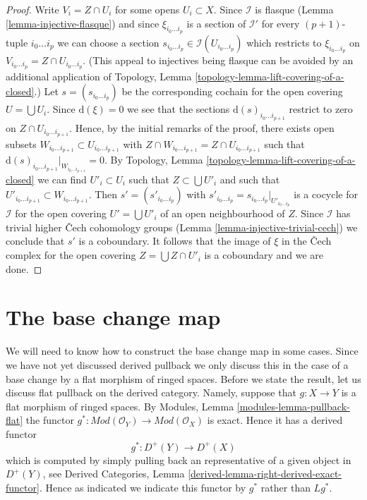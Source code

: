 \begin{proof}
\medskip\noindent
Write $V_i = Z \cap U_i$ for some opens $U_i \subset X$.
Since $\mathcal{I}$ is flasque (Lemma \ref{lemma-injective-flasque})
and since $\xi_{i_0 \ldots i_p}$ is a section of $\mathcal{I}'$
for every $(p + 1)$-tuple $i_0 \ldots i_p$ we can choose
a section $s_{i_0 \ldots i_p} \in \mathcal{I}(U_{i_0 \ldots i_p})$
which restricts to $\xi_{i_0 \ldots i_p}$ on
$V_{i_0 \ldots i_p} = Z \cap U_{i_0 \ldots i_p}$.
(This appeal to injectives being flasque can be avoided by an
additional application of
Topology, Lemma \ref{topology-lemma-lift-covering-of-a-closed}.)
Let $s = (s_{i_0 \ldots i_p})$ be the corresponding cochain
for the open covering $U = \bigcup U_i$.
Since $\text{d}(\xi) = 0$ we see that the sections
$\text{d}(s)_{i_0 \ldots i_{p + 1}}$ restrict to zero
on $Z \cap U_{i_0 \ldots i_{p + 1}}$. Hence, by the initial
remarks of the proof, there exists open subsets
$W_{i_0 \ldots i_{p + 1}} \subset U_{i_0 \ldots i_{p + 1}}$
with $Z \cap W_{i_0 \ldots i_{p + 1}} = Z \cap U_{i_0 \ldots i_{p + 1}}$
such that $\text{d}(s)_{i_0 \ldots i_{p + 1}}|_{W_{i_0 \ldots i_{p + 1}}} = 0$.
By Topology, Lemma \ref{topology-lemma-lift-covering-of-a-closed}
we can find $U'_i \subset U_i$ such that $Z \subset \bigcup U'_i$
and such that $U'_{i_0 \ldots i_{p + 1}} \subset W_{i_0 \ldots i_{p + 1}}$.
Then $s' = (s'_{i_0 \ldots i_p})$ with
$s'_{i_0 \ldots i_p} = s_{i_0 \ldots i_p}|_{U'_{i_0 \ldots i_p}}$
is a cocycle for $\mathcal{I}$ for the open covering
$U' = \bigcup U'_i$ of an open neighbourhood of $Z$.
Since $\mathcal{I}$ has trivial higher {\v C}ech cohomology groups
(Lemma \ref{lemma-injective-trivial-cech})
we conclude that $s'$ is a coboundary. It follows that the image of
$\xi$ in the {\v C}ech complex for the open covering
$Z = \bigcup Z \cap U'_i$ is a coboundary and we are done.
\end{proof}






\section{The base change map}
\label{section-base-change-map}

\noindent
We will need to know how to construct the base change map in some cases.
Since we have not yet discussed derived pullback we only discuss
this in the case of a base change by a flat morphism of ringed spaces.
Before we state the result, let us discuss flat pullback on the derived
category. Namely, suppose that $g : X \to Y$ is a flat morphism of
ringed spaces. By Modules, Lemma \ref{modules-lemma-pullback-flat}
the functor $g^* : \textit{Mod}(\mathcal{O}_Y) \to
\textit{Mod}(\mathcal{O}_X)$ is exact. Hence it has a derived functor
$$
g^* : D^{+}(Y) \to D^{+}(X)
$$
which is computed by simply pulling back an representative of a given
object in $D^{+}(Y)$, see
Derived Categories, Lemma \ref{derived-lemma-right-derived-exact-functor}.
Hence as indicated we indicate this functor by $g^*$ rather than
$Lg^*$.


